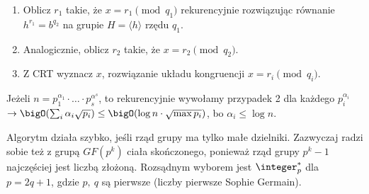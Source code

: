 \begin{greyframe}
\begin{enumerate}
\begin{enumerate}
			      \item Oblicz \( r_1 \) takie, że \(x = r_1 \pmod{q_1}\) rekurencyjnie rozwiązując równanie \( h^{r_1} = b^{q_2} \) na grupie \( H = \langle h \rangle \) rzędu \(q_1\).
			      \item Analogicznie, oblicz \( r_2 \) takie, że \( x = r_2 \pmod{q_2} \).
			      \item Z CRT wyznacz \( x \), rozwiązanie układu kongruencji \( x = r_i \pmod{q_i} \).
		      \end{enumerate}
		      Jeżeli \( n = p_1^{\alpha_1} \cdot \ldots \cdot p_s^{\alpha^s} \), to rekurencyjnie wywołamy przypadek 2 dla każdego \( p_i^{\alpha_i} \) \( \rightarrow \bigO(\sum_i \alpha_i \sqrt{p_i}) \leq \bigO(\log n \cdot \sqrt{\max{p_i}}) \), bo \( \alpha_i \leq \log n \).
	\end{enumerate}
\end{greyframe}

Algorytm działa szybko, jeśli rząd grupy ma tylko małe dzielniki. Zazwyczaj radzi sobie też z grupą \( GF(p^k) \) ciała skończonego, ponieważ rząd grupy \( p^k - 1 \) najczęściej jest liczbą złożoną.
Rozsądnym wyborem jest \( \integer^{*}_p \) dla \( p = 2q + 1 \), gdzie \( p, \ q \) są pierwsze (liczby pierwsze Sophie Germain).
